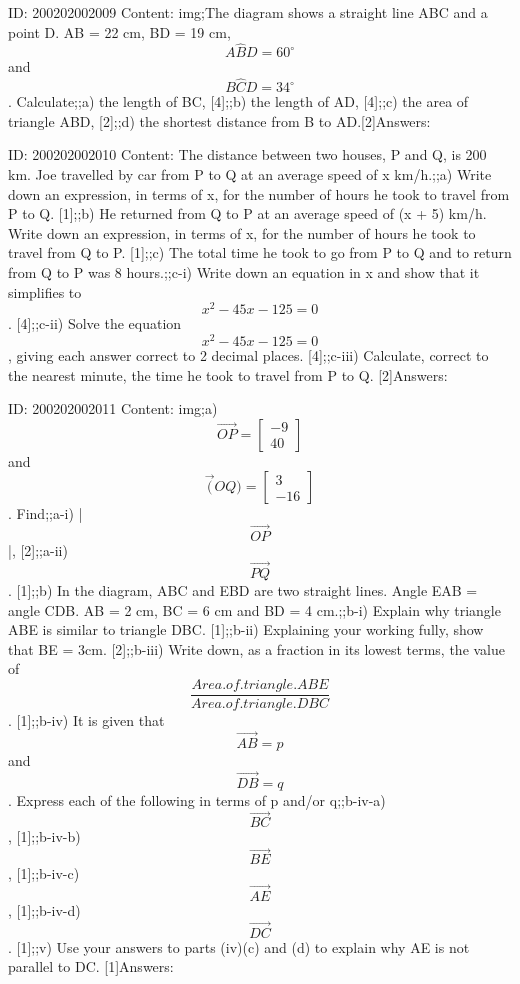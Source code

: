 \documentclass{article}
\begin{document}
ID: 200202002009
Content:
img;The diagram shows a straight line ABC and a point D. AB = 22 cm, BD = 19 cm, $$A \hat BD=60^{\circ}$$ and $$B \hat CD=34^{\circ}$$. Calculate;;a) the length of BC, [4];;b) the length of AD, [4];;c) the area of triangle ABD, [2];;d) the shortest distance from B to AD.[2]Answers:

ID: 200202002010
Content:
The distance between two houses, P and Q, is 200 km. Joe travelled by car from P to Q at an average speed of x km/h.;;a) Write down an expression, in terms of x, for the number of hours he took to travel from P to Q. [1];;b) He returned from Q to P at an average speed of (x + 5) km/h. Write down an expression, in terms of x, for the number of hours he took to travel from Q to P. [1];;c) The total time he took to go from P to Q and to return from Q to P was 8 hours.;;c-i) Write down an equation in x and show that it simplifies to $$x^2 -45x-125=0$$. [4];;c-ii) Solve the equation $$x^{2} -45x-125=0$$, giving each answer correct to 2 decimal places. [4];;c-iii) Calculate, correct to the nearest minute, the time he took to travel from P to Q. [2]Answers:

ID: 200202002011
Content:
img;a) $$\vec{OP}= \begin{bmatrix}-9\\40\end{bmatrix}$$ and $$\vec(OQ)=\begin{bmatrix}3\\-16\end{bmatrix}$$. Find;;a-i) |$$\vec{OP}$$|, [2];;a-ii) $$\vec{PQ}$$. [1];;b) In the diagram, ABC and EBD are two straight lines. Angle EAB = angle CDB. AB = 2 cm, BC = 6 cm and BD = 4 cm.;;b-i) Explain why triangle ABE is similar to triangle DBC. [1];;b-ii) Explaining your working fully, show that BE = 3cm. [2];;b-iii) Write down, as a fraction in its lowest terms, the value of $$\frac{Area.of.triangle.ABE}{Area.of.triangle.DBC}$$ . [1];;b-iv) It is given that $$\vec{AB}=p$$ and $$\vec{DB}=q$$. Express each of the following in terms of p and/or q;;b-iv-a) $$\vec{BC}$$, [1];;b-iv-b) $$\vec{BE}$$, [1];;b-iv-c) $$\vec{AE}$$, [1];;b-iv-d) $$\vec{DC}$$. [1];;v) Use your answers to parts (iv)(c) and (d) to explain why AE is not parallel to DC. [1]Answers:
\end{document}
